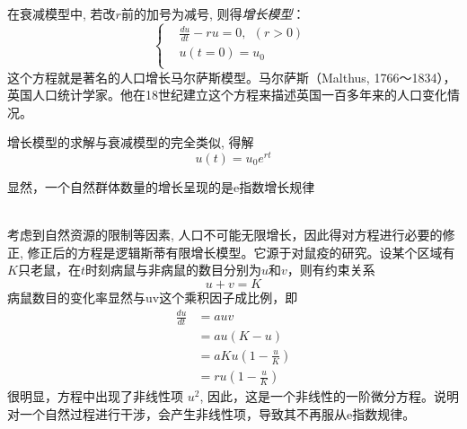 	在衰减模型中, 若改$r$前的加号为减号, 则得\emph{增长模型}：
	\begin{equation}
		\boxed{\left\{\begin{aligned}
			&\frac{du}{dt} - ru =0, ~~(r>0)~~ \\
			&u(t=0) = u_0	 \\ 
		\end{aligned}\right.} 
	\end{equation}
	这个方程就是著名的人口增长马尔萨斯模型。马尔萨斯（Malthus, 1766～1834），英国人口统计学家。他在18世纪建立这个方程来描述英国一百多年来的人口变化情况。

	增长模型的求解与衰减模型的完全类似, 得解
	\begin{equation}
		\boxed{u(t) = u_0 e^{r t}} 
	\end{equation}
	\begin{hint}
		显然，一个自然群体数量的增长呈现的是e指数增长规律
	\end{hint}
	~~\\

	考虑到自然资源的限制等因素, 人口不可能无限增长，因此得对方程进行必要的修正, 修正后的方程是逻辑斯蒂有限增长模型。它源于对鼠疫的研究。设某个区域有$K$只老鼠，在$t$时刻病鼠与非病鼠的数目分别为$u$和$v$，则有约束关系
	$$
	 u+v=K
	$$ 
	病鼠数目的变化率显然与uv这个乘积因子成比例，即
	$$
	\begin{aligned}
		\frac{du}{dt} &= a uv \\
		&= au(K-u) \\
		&= aKu(1-\frac{u}{K}) \\
		&= r u(1-\frac{u}{K})
	\end{aligned}
	$$ 
	很明显，方程中出现了非线性项 $u^2$, 因此，这是一个非线性的一阶微分方程。说明对一个自然过程进行干涉，会产生非线性项，导致其不再服从e指数规律。

